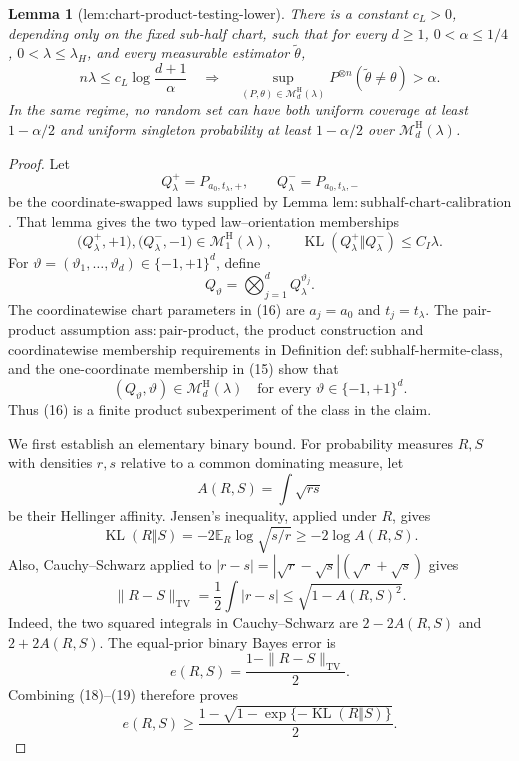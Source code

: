\documentclass{article}
\newtheorem{lemma}{Lemma}
\begin{document}
\begin{lemma}[lem:chart-product-testing-lower]\label{lem:chart-product-testing-lower}
There is a constant \(c_L>0\), depending only on the fixed sub-half chart, such that for every \(d\ge1\), \(0<\alpha\le1/4\), \(0<\lambda\le\lambda_H\), and every measurable estimator \(\widetilde\theta\),
\[
n\lambda\le c_L\log\frac{d+1}{\alpha}
\quad\Longrightarrow\quad
\sup_{(P,\theta)\in\mathcal M_d^{\mathrm H}(\lambda)}
P^{\otimes n}(\widetilde\theta\ne\theta)>\alpha.
\]
In the same regime, no random set can have both uniform coverage at least \(1-\alpha/2\) and uniform singleton probability at least \(1-\alpha/2\) over \(\mathcal M_d^{\mathrm H}(\lambda)\).
\end{lemma}
\begin{proof}
Let
\[
Q_\lambda^+=P_{a_0,t_\lambda,+},
\qquad
Q_\lambda^-=P_{a_0,t_\lambda,-}
\]
be the coordinate-swapped laws supplied by Lemma \(\mathrm{lem:subhalf\text{-}chart\text{-}calibration}\).  That lemma gives the two typed law--orientation memberships
\[
\bigl(Q_\lambda^+,+1\bigr),
\bigl(Q_\lambda^-,-1\bigr)\in\mathcal M_1^{\mathrm H}(\lambda),
\qquad
\operatorname{KL}(Q_\lambda^+\Vert Q_\lambda^-)
\le C_I\lambda.
\tag{15}
\]
For \(\vartheta=(\vartheta_1,\ldots,\vartheta_d)\in\{-1,+1\}^d\), define
\[
Q_\vartheta=\bigotimes_{j=1}^d Q_\lambda^{\vartheta_j}.
\tag{16}
\]
The coordinatewise chart parameters in (16) are \(a_j=a_0\) and \(t_j=t_\lambda\).  The pair-product assumption \(\mathrm{ass:pair\text{-}product}\), the product construction and coordinatewise membership requirements in Definition \(\mathrm{def:subhalf\text{-}hermite\text{-}class}\), and the one-coordinate membership in (15) show that
\[
(Q_\vartheta,\vartheta)\in\mathcal M_d^{\mathrm H}(\lambda)
\quad\text{for every }\vartheta\in\{-1,+1\}^d.
\tag{17}
\]
Thus (16) is a finite product subexperiment of the class in the claim.

We first establish an elementary binary bound.  For probability measures \(R,S\) with densities \(r,s\) relative to a common dominating measure, let
\[
A(R,S)=\int\sqrt{rs}
\]
be their Hellinger affinity.  Jensen's inequality, applied under \(R\), gives
\[
\operatorname{KL}(R\Vert S)
=-2\mathbb E_R\log\sqrt{s/r}
\ge-2\log A(R,S).
\tag{18}
\]
Also, Cauchy--Schwarz applied to
\(|r-s|=|\sqrt r-\sqrt s|(\sqrt r+\sqrt s)\) gives
\[
\|R-S\|_{\mathrm{TV}}
=\frac12\int|r-s|
\le\sqrt{1-A(R,S)^2}.
\tag{19}
\]
Indeed, the two squared integrals in Cauchy--Schwarz are \(2-2A(R,S)\) and \(2+2A(R,S)\).  The equal-prior binary Bayes error is
\[
e(R,S)=\frac{1-\|R-S\|_{\mathrm{TV}}}{2}.
\]
Combining (18)--(19) therefore proves
\[
e(R,S)\ge
\frac{1-\sqrt{1-\exp\{-\operatorname{KL}(R\Vert S)\}}}{2}.
\tag{20}
\]


\end{proof}
\end{document}
